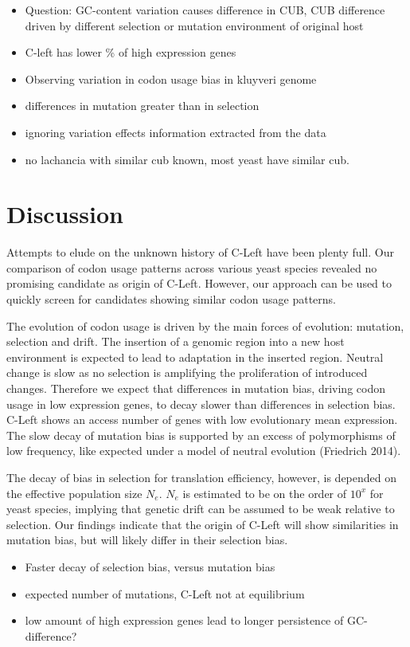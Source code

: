 \documentclass[12pt,draft]{article}
\begin{document}
\begin{itemize}
	\item Question: GC-content variation causes difference in CUB, CUB difference driven by different selection or mutation environment of original host
	\item C-left has lower \% of high expression genes
	\item Observing variation in codon usage bias in kluyveri genome
	\item differences in mutation greater than in selection
	\item ignoring variation effects information extracted from the data
	\item no lachancia with similar cub known, most yeast have similar cub.
\end{itemize}

\section*{Discussion}

Attempts to elude on the unknown history of C-Left have been plenty full. 
Our comparison of codon usage patterns across various yeast species revealed no promising candidate as origin of C-Left.
However, our approach can be used to quickly screen for candidates showing similar codon usage patterns.

The evolution of codon usage is driven by the main forces of evolution: mutation, selection and drift.
The insertion of a genomic region into a new host environment is expected to lead to adaptation in the inserted region.
Neutral change is slow as no selection is amplifying the proliferation of introduced changes.
Therefore we expect that differences in mutation bias, driving codon usage in low expression genes, to decay slower than differences in selection bias.
C-Left shows an access number of genes with low evolutionary mean expression.
The slow decay of mutation bias is supported by an excess of polymorphisms of low frequency, like expected under a model of neutral evolution (Friedrich 2014).

The decay of bias in selection for translation efficiency, however, is depended on the effective population size $N_e$.  
$N_e$ is estimated to be on the order of $10^x$ for yeast species, implying that genetic drift can be assumed to be weak relative to selection.
Our findings indicate that the origin of C-Left will show similarities in mutation bias, but will likely differ in their selection bias.


\begin{itemize}
	\item Faster decay of selection bias, versus mutation bias
	\item expected number of mutations, C-Left not at equilibrium
	\item low amount of high expression genes lead to longer persistence of GC-difference?
\end{itemize}
\end{document}
